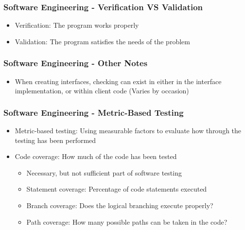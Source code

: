 \begin{frame}\frametitle{Software Engineering - Verification VS Validation}
\begin{itemize}
\item Verification: The program works properly
\item Validation: The program satisfies the needs of the problem
\end{itemize}
\end{frame}

\begin{frame}\frametitle{Software Engineering - Other Notes}
\begin{itemize}
\item When creating interfaces, checking can exist in either in the interface implementation, or within client code (Varies by occasion)
\end{itemize}
\end{frame}

\begin{frame}\frametitle{Software Engineering - Metric-Based Testing}
\begin{itemize}
\item Metric-based testing: Using measurable factors to evaluate how through the testing has been performed
\item Code coverage: How much of the code has been tested
	\begin{itemize}
	\item Necessary, but not sufficient part of software testing
	\item Statement coverage: Percentage of code statements executed
	\item Branch coverage: Does the logical branching execute properly?
	\item Path coverage: How many possible paths can be taken in the code?
	\end{itemize}
\end{itemize}
\end{frame}

